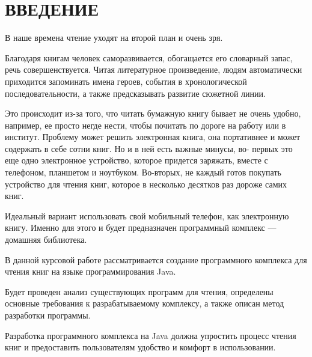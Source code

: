 \chapter*{ВВЕДЕНИЕ}

В наше времена чтение уходят на второй план и очень зря.\par
Благодаря книгам человек саморазвивается, обогащается его словарный
запас, речь совершенствуется. Читая литературное произведение, людям
автоматически приходится запоминать имена героев, события в
хронологической последовательности, а также предсказывать развитие
сюжетной линии.\par
Это происходит из-за того, что читать бумажную книгу бывает не очень
удобно, например, ее просто негде нести, чтобы почитать по дороге на работу
или в институт. Проблему может решить электронная книга, она портативнее
и может содержать в себе сотни книг. Но и в ней есть важные минусы, во-
первых это еще одно электронное устройство, которое придется заряжать,
вместе с телефоном, планшетом и ноутбуком. Во-вторых, не каждый готов
покупать устройство для чтения книг, которое в несколько десятков раз
дороже самих книг.\par
Идеальный вариант использовать свой мобильный телефон, как
электронную книгу. Именно для этого и будет предназначен программный
комплекс --- домашняя библиотека.\par
В данной курсовой работе рассматривается создание программного комплекса
для чтения книг на языке программирования Java.\par
Будет проведен анализ существующих программ для чтения,
определены основные требования к разрабатываемому комплексу,
а также описан метод разработки программы.\par
Разработка программного комплекса на Java должна упростить
процесс чтения книг и предоставить пользователям удобство и
комфорт в использовании.

